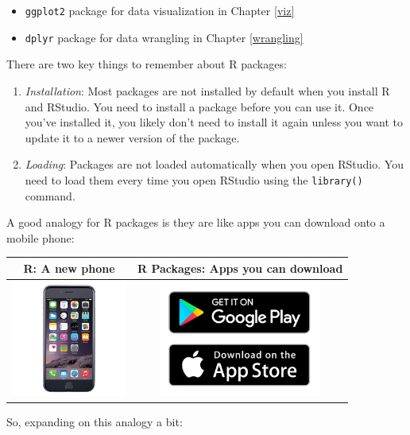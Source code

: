 \documentclass[12pt,]{krantz}
\providecommand{\tightlist}{%
  \setlength{\itemsep}{0pt}\setlength{\parskip}{0pt}}
\begin{document}
\begin{itemize}
\tightlist
\item
  \texttt{ggplot2} package for data visualization in Chapter \ref{viz}
\item
  \texttt{dplyr} package for data wrangling in Chapter \ref{wrangling}
\end{itemize}

There are two key things to remember about R packages:

\begin{enumerate}
\def\labelenumi{\arabic{enumi}.}
\tightlist
\item
  \emph{Installation}: Most packages are not installed by default when
  you install R and RStudio. You need to install a package before you
  can use it. Once you've installed it, you likely don't need to install
  it again unless you want to update it to a newer version of the
  package.
\item
  \emph{Loading}: Packages are not loaded automatically when you open
  RStudio. You need to load them every time you open RStudio using the
  \texttt{library()} command.
\end{enumerate}

A good analogy for R packages is they are like apps you can download
onto a mobile phone:

\begin{longtable}[]{@{}cc@{}}
\toprule
R: A new phone & R Packages: Apps you can download\tabularnewline
\midrule
\endhead
\includegraphics[height=1.50000in]{images/iphone.jpg} &
\includegraphics[height=1.50000in]{images/apps.jpg}\tabularnewline
\bottomrule
\end{longtable}

So, expanding on this analogy a bit:
\end{document}
